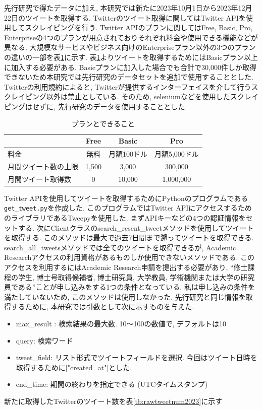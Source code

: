 \noindent
先行研究で得たデータに加え, 本研究では新たに2023年10月1日から2023年12月22日のツイートを取得する. Twitterのツイート取得に関してはTwitter APIを使用してスクレイピングを行う. Twitter APIのプランに関してはFree, Basic, Pro, Enterpriseの4つのプランが用意されておりそれぞれ料金や使用できる機能などが異なる. 大規模なサービスやビジネス向けのEnterpriseプラン以外の3つのプランの違いの一部を表\ref{tb:xplan}に示す. 
表\ref{tb:xplan}よりツイートを取得するためにはBasicプラン以上に加入する必要がある. Basicプランに加入した場合でも合計で30,000件しか取得できないため本研究では先行研究のデータセットを追加で使用することとした. Twitterの利用規約によると, Twitterが提供するインターフェイスを介して行うスクレイピング以外は禁止としている. そのため, seleniumなどを使用したスクレイピングはせずに, 先行研究のデータを使用することとした. 

\begin{table}[H]
  \caption{プランとできること}
  \label{tb:xplan}
  \begin{center}
  \begin{tabular}{l|c|c|c}
    \hline
    &Free&Basic&Pro \\\hline\hline
    料金&無料&月額100ドル&月額5,000ドル \\\hline
    月間ツイート数の上限&1,500&3,000&300,000 \\\hline
    月間ツイート取得数&0&10,000&1,000,000 \\\hline
  \end{tabular}\end{center}
\end{table}

Twitter APIを使用してツイートを取得するためにPythonのプログラムである\verb|get_tweet.py|を作成した. このプログラムではTwitter APIにアクセスするためのライブラリであるTweepy\cite{tweepy}を使用した. まずAPIキーなどの4つの認証情報をセットする. 次にClientクラスのsearch\_resent\_tweetメソッドを使用してツイートを取得する. 
このメソッドは最大で過去7日間まで遡ってツイートを取得できる. search\_all\_tweetsメソッドでは全てのツイートを取得できるが, Academic Researchアクセスの利用資格があるものしか使用できないメソッドである. このアクセスを利用するにはAcademic Research申請を提出する必要があり, ``修士課程の学生, 博士号取得候補者, 博士研究員, 大学教員, 学術機関または大学の研究員である''ことが申し込みをする1つの条件となっている. \cite{academic-research}
私は申し込みの条件を満たしていないため, このメソッドは使用しなかった. 
先行研究と同じ情報を取得するために, 本研究では引数として次に示すものを与えた. 
\begin{itemize}
 \item max\_result : 検索結果の最大数. 10〜100の数値で, デフォルトは10
 \item query: 検索ワード
 \item tweet\_field: リスト形式でツイートフィールドを選択. 今回はツイート日時を取得するために["created\_at"]とした. 
 \item end\_time: 期間の終わりを指定できる (UTCタイムスタンプ) 
\end{itemize}
新たに取得したTwitterのツイート数を表\ref{tb:rawtweetnum2023}に示す

